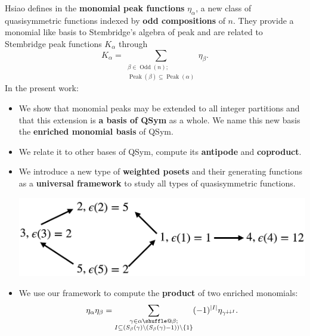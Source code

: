 \documentclass[numbers=enddot,12pt,final,onecolumn,notitlepage]{scrartcl}%
\makeatletter
\newcommand{\al}{\alpha}
\newcommand{\be}{\beta}
\newcommand{\Odd}{\operatorname{Odd}}
\newcommand{\Peak}{\operatorname{Peak}}
\providecommand*{\shuffle}{%
  \mathbin{\mathpalette\shuffle@{}}%
}
\newcommand*{\shuffle@}[2]{%
  \sbox0{$#1\vcenter{}$}%
  \kern .15\ht0 %
  \rlap{\vrule height .25\ht0 depth 0pt width 2.5\ht0}%
  \raise.1\ht0\hbox to 2.5\ht0{%
    \vrule height 1.75\ht0 depth -.1\ht0 width .17\ht0 %
    \hfill
    \vrule height 1.75\ht0 depth -.1\ht0 width .17\ht0 %
    \hfill
    \vrule height 1.75\ht0 depth -.1\ht0 width .17\ht0 %
  }%
  \kern .15\ht0 %
}
\newcommand{\0}{\phantom{c}}
\let\sumnonlimits\sum
\renewcommand{\sum}{\sumnonlimits\limits}
\makeatother
\begin{document}
\begin{tcolorbox}[colback=cyan!5,colframe=cyan!75!black, fonttitle=\bfseries,title=Summary of our work] Hsiao defines in \cite{Hsi07} the \textbf{monomial peak functions} $\eta_{\al}$, a new class of quasisymmetric functions indexed by \textbf{odd compositions} of $n$. They provide a monomial like basis to Stembridge's algebra of peak \cite{Ste97} and are related to Stembridge peak functions $K_\al$ through
\begin{equation*}
K_{\al} = \sum_{{\substack{\beta \in \Odd(n);\\ \Peak(\beta) \subseteq \Peak(\al)}}} \eta_{\beta}.
\end{equation*}
In the present work: 
\begin{itemize}
\item We show that monomial peaks may be extended to all integer partitions and that this extension is \textbf{a basis of QSym} as a whole. We name this new basis the \textbf{enriched monomial basis} of QSym.
\item We relate it to other bases of QSym, compute its \textbf{antipode} and \textbf{coproduct}. 
\item We introduce a new type of \textbf{weighted posets} and their generating functions as a \textbf{universal framework} to study all types of quasisymmetric functions.

\begin{center}
\includegraphics[scale=0.16]{Poset.png}
\end{center}
 
\item We use our framework to compute the \textbf{product} of two enriched monomials:
\begin{equation*}
\eta_\al \eta_\beta
= \sum_{\substack{\gamma \in \al \shuffle \be ;\\
                   I\subseteq \left(S_{\be}(\gamma)\setminus (S_{\be}(\gamma)-1)\right) \setminus \left\{1\right\}}}
(-1)^{|I|}\eta_{\gamma^{\downarrow\downarrow I}} .
\end{equation*}
\end{itemize}
\end{tcolorbox}
\end{document}
